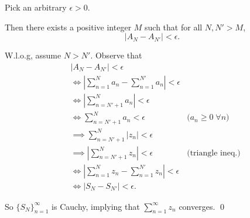 \documentclass[oneside]{article}
\newcommand\abs[1]{\left|#1\right|}
\begin{document}
\begin{enumerate}[label=\textbf{(\alph*)}]
      Pick an arbitrary $\epsilon > 0$.

      Then there exists a positive integer $M$ such that for all $N, N' > M$,\[
        \abs{A_N - A_{N'}} < \epsilon\text{.}
      \]

      W.l.o.g, assume $N > N'$. Observe that \begin{align*}
        &\abs{A_N - A_{N'}} < \epsilon \\
        &\iff \abs{\sum_{n=1}^N a_n - \sum_{n=1}^{N'} a_n} < \epsilon \\
        &\iff \abs{\sum_{n=N'+1}^N a_n} < \epsilon \\
        &\iff \sum_{n=N'+1}^N a_n < \epsilon
          & \text{($a_n \geq 0 \;\forall n$)}\\
        &\implies \sum_{n=N'+1}^N \abs{z_n} < \epsilon \\
        &\implies \abs{\sum_{n=N'+1}^N z_n} < \epsilon
          & \text{(triangle ineq.)}\\
        &\iff \abs{\sum_{n=1}^N z_n - \sum_{n=1}^{N'} z_n} < \epsilon \\
        &\iff \abs{S_N - S_{N'}} < \epsilon\text{.}
      \end{align*}

      So $\{S_N\}_{n=1}^\infty$ is Cauchy, implying that $\sum_{n=1}^\infty z_n$
      converges.
      \qed

  \end{enumerate}
\end{document}

